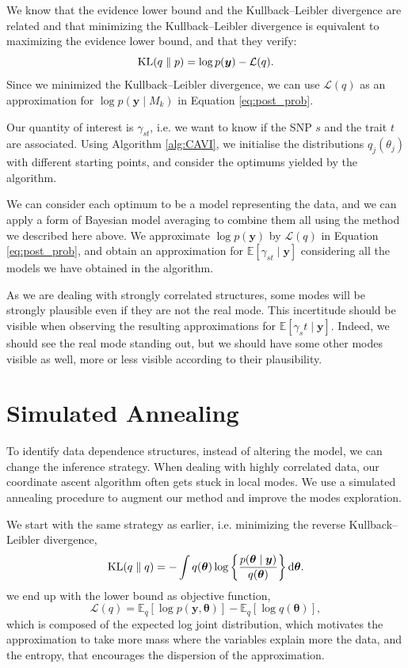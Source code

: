 \documentclass[a4paper, 11pt]{report}
\numberwithin{equation}{chapter}
\DeclareMathOperator*{\KL}{{\rm KL}}
\begin{document}
We know that the evidence lower bound and the Kullback--Leibler divergence are related and that minimizing the Kullback--Leibler divergence is equivalent to maximizing the evidence lower bound, and that they verify: 
\begin{equation*}
\KL(q\parallel p) = \log p (\boldsymbol{y}) - \mathcal{L}(q).
\end{equation*}
Since we minimized the Kullback--Leibler divergence, we can use $\mathcal{L}(q)$ as an approximation for $\log p(\boldsymbol{y}\mid M_k)$ in Equation \ref{eq:post_prob}.

Our quantity of interest is $\gamma_{st}$, i.e. we want to know if the SNP $s$ and the trait $t$ are associated. Using Algorithm \ref{alg:CAVI}, we initialise the distributions $q_j(\theta_j)$ with different starting points, and consider the optimums yielded by the algorithm.

We can consider each optimum to be a model representing the data, and we can apply a form of Bayesian model averaging to combine them all using the method we described here above. We approximate $\log p(\boldsymbol{y})$ by $\mathcal{L}(q)$ in Equation \ref{eq:post_prob}, and obtain an approximation for $\mathbb{E}\left[\gamma_{st}\mid \boldsymbol{y}\right]$ considering all the models we have obtained in the algorithm.

As we are dealing with strongly correlated structures, some modes will be strongly plausible even if they are not the real mode. This incertitude should be visible when observing the resulting approximations for $\mathbb{E}\left[\gamma_st\mid \boldsymbol{y}\right]$. Indeed, we should see the real mode standing out, but we should have some other modes visible as well, more or less visible according to their plausibility.
\newpage
\section{Simulated Annealing}
To identify data dependence structures, instead of altering the model, we can change the inference strategy. When dealing with highly correlated data, our coordinate ascent algorithm often gets stuck in local modes. We use a simulated annealing procedure to augment our method and improve the modes exploration.

We start with the same strategy as earlier, i.e. minimizing the reverse Kullback--Leibler divergence,
\begin{equation*}
\KL(q \parallel q) = -\int q(\boldsymbol{\theta}) \log\left\lbrace\frac{p(\boldsymbol{\theta}\mid\boldsymbol{y})}{q(\boldsymbol{\theta})}\right\rbrace \mathrm{d}\boldsymbol{\theta}.
\end{equation*}
we end up with the lower bound as objective function,
\begin{equation*}
\mathcal{L}(q) = \mathbb{E}_q\left[ \log p(\boldsymbol{y}, \boldsymbol{\theta})\right] - \mathbb{E}_q\left[\log q(\boldsymbol{\theta})\right],
\end{equation*}
which is composed of the expected log joint distribution, which motivates the approximation to take more mass where the variables explain more the data, and the entropy, that encourages the dispersion of the approximation. 
\end{document}
